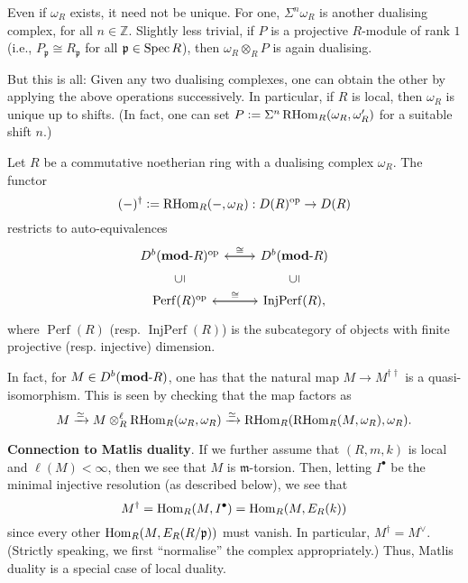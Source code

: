 \documentclass[12pt]{article}
\DeclareMathOperator{\Perf}{Perf}
\DeclareMathOperator{\Ferp}{InjPerf}
\begin{document}
\begin{rem}[Uniqueness]
	Even if $\omega_{R}$ exists, it need not be unique. For one, $\Sigma^{n} \omega_{R}$ is another dualising complex, for all $n \in \mathbb{Z}$. \newline
	Slightly less trivial, if $P$ is a projective $R$-module of rank $1$ (i.e., $P_{\mathfrak{p}} \cong R_{\mathfrak{p}}$ for all $\mathfrak{p} \in \operatorname{Spec} R$), then $\omega_{R} \otimes_{R} P$ is again dualising. 

	But this is all: Given any two dualising complexes, one can obtain the other by applying the above operations successively. In particular, if $R$ is local, then $\omega_{R}$ is unique up to shifts. (In fact, one can set $P \vcentcolon= \Sigma^{n} \operatorname{RHom}_{R}(\omega_{R}, \omega_{R}')$ for a suitable shift $n$.) 
\end{rem}

\begin{thm}
	Let $R$ be a commutative noetherian ring with a dualising complex $\omega_{R}$. The functor
	\begin{equation*} 
		(-)^{\dagger} \vcentcolon= \operatorname{RHom}_{R}(-, \omega_{R}) : D(R)^{\operatorname{op}} \to D(R)
	\end{equation*}
	restricts to auto-equivalences
	\begin{equation*} 
		\begin{tikzcd} %
		D^{b}(\rmod{R})^{\op} \arrow[r, "\cong"] & D^{b}(\rmod{R}) \arrow[l] \\
		\Perf(R)^{\op} \arrow[r, "\cong"] \arrow[u, phantom, sloped, "\subset"] & \Ferp(R), \arrow[u, phantom, sloped, "\subset"] \arrow[l]
		\end{tikzcd}
	\end{equation*}
	where $\Perf(R)$ (resp. $\Ferp(R)$) is the subcategory of objects with finite projective (resp. injective) dimension.
\end{thm}
In fact, for $M \in D^{b}(\mathbf{mod}\text{-}R)$, one has that the natural map $M \to M^{\dagger \dagger}$ is a quasi-isomorphism. This is seen by checking that the map factors as
\begin{equation*} 
	M \xrightarrow{\simeq} M \otimes^{\ell}_{R} \operatorname{RHom}_{R}(\omega_{R}, \omega_{R}) \xrightarrow{\simeq} \operatorname{RHom}_{R}(\operatorname{RHom}_{R}(M, \omega_{R}), \omega_{R}).
\end{equation*}

\textbf{Connection to Matlis duality}. If we further assume that $(R, m, k)$ is local and $\ell(M) < \infty$, then we see that $M$ is $\mathfrak{m}$-torsion. Then, letting $I^{\bullet}$ be the minimal injective resolution (as described below), we see that
\begin{equation*} 
	M^{\dagger} = \operatorname{Hom}_{R}(M, I^{\bullet}) = \operatorname{Hom}_{R}(M, E_{R}(k))
\end{equation*}
since every other $\operatorname{Hom}_{R}(M, E_{R}(R/\mathfrak{p}))$ must vanish. In particular, $M^{\dagger} = M^{\vee}$. (Strictly speaking, we first ``normalise'' the complex appropriately.) \newline
Thus, Matlis duality is a special case of local duality.
\end{document}
